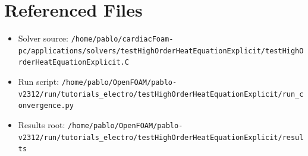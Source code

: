 \documentclass[11pt,a4paper]{article}
\begin{document}
\section*{Referenced Files}
\begin{itemize}
\item Solver source: \texttt{/home/pablo/cardiacFoam-pc/applications/solvers/testHighOrderHeatEquationExplicit/testHighOrderHeatEquationExplicit.C}
\item Run script: \texttt{/home/pablo/OpenFOAM/pablo-v2312/run/tutorials\_electro/testHighOrderHeatEquationExplicit/run\_convergence.py}
\item Results root: \texttt{/home/pablo/OpenFOAM/pablo-v2312/run/tutorials\_electro/testHighOrderHeatEquationExplicit/results}
\end{itemize}
\end{document}
